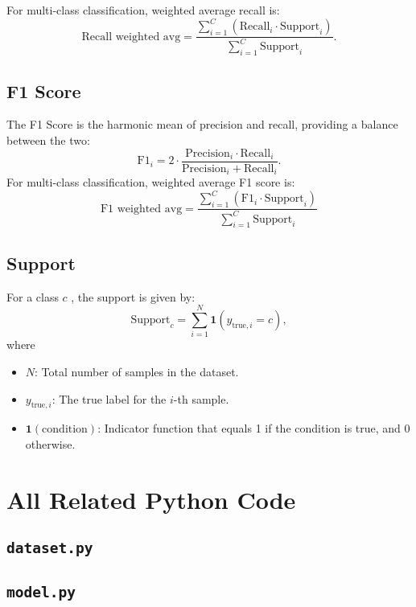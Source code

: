 \documentclass[a4paper,12pt]{article}
\begin{document}
For multi-class classification, weighted average recall is:
$$
\text{Recall weighted avg} = \frac{\sum_{i=1}^C (\text{Recall}_i \cdot \text{Support}_i)}{\sum_{i=1}^C \text{Support}_i}.
$$

\subsection{F1 Score}

The F1 Score is the harmonic mean of precision and recall, providing a balance between the two:
$$
\text{F1}_i = 2 \cdot \frac{\text{Precision}_i \cdot \text{Recall}_i}{\text{Precision}_i + \text{Recall}_i}.
$$
For multi-class classification, weighted average F1 score is:
$$
\text{F1 weighted avg} = \frac{\sum_{i=1}^C (\text{F1}_i \cdot \text{Support}_i)}{\sum_{i=1}^C \text{Support}_i}
$$

\subsection{Support}

For a class $c$ , the support is given by:
$$
\text{Support}_c = \sum_{i=1}^N \mathbf{1}(y_{\text{true},i} = c),
$$
where
\begin{itemize}
	\item $N$: Total number of samples in the dataset.
	\item $y_{\text{true},i}$: The true label for the $i$-th sample.
	\item $\mathbf{1}(\text{condition})$: Indicator function that equals 1 if the condition is true, and 0 otherwise.
\end{itemize}

\newpage
\section{All Related Python Code}

\subsection{\texttt{dataset.py}}
\label{app:dataset_py}


\subsection{\texttt{model.py}}
\label{app:model_py}
\end{document}
